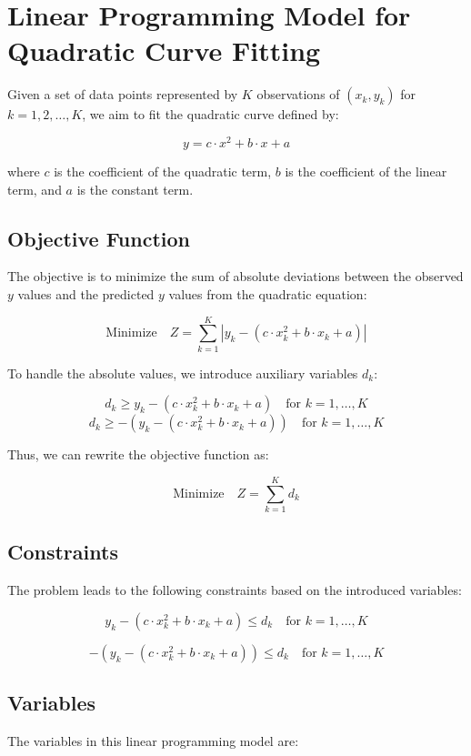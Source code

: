 \documentclass{article}
\begin{document}
\section*{Linear Programming Model for Quadratic Curve Fitting}

Given a set of data points represented by \( K \) observations of \( (x_k, y_k) \) for \( k = 1, 2, \ldots, K \), we aim to fit the quadratic curve defined by:

\[
y = c \cdot x^2 + b \cdot x + a
\]

where \( c \) is the coefficient of the quadratic term, \( b \) is the coefficient of the linear term, and \( a \) is the constant term.

\subsection*{Objective Function}
The objective is to minimize the sum of absolute deviations between the observed \( y \) values and the predicted \( y \) values from the quadratic equation:

\[
\text{Minimize} \quad Z = \sum_{k=1}^{K} |y_k - (c \cdot x_k^2 + b \cdot x_k + a)|
\]

To handle the absolute values, we introduce auxiliary variables \( d_k \):

\[
d_k \geq y_k - (c \cdot x_k^2 + b \cdot x_k + a) \quad \text{for } k = 1, \ldots, K
\]
\[
d_k \geq -(y_k - (c \cdot x_k^2 + b \cdot x_k + a)) \quad \text{for } k = 1, \ldots, K
\]

Thus, we can rewrite the objective function as:

\[
\text{Minimize} \quad Z = \sum_{k=1}^{K} d_k
\]

\subsection*{Constraints}
The problem leads to the following constraints based on the introduced variables:

\[
y_k - (c \cdot x_k^2 + b \cdot x_k + a) \leq d_k \quad \text{for } k = 1, \ldots, K
\]

\[
-(y_k - (c \cdot x_k^2 + b \cdot x_k + a)) \leq d_k \quad \text{for } k = 1, \ldots, K
\]

\subsection*{Variables}
The variables in this linear programming model are:
\end{document}
